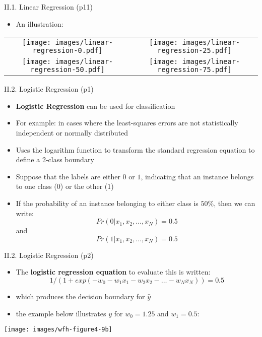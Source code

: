 \documentclass[handout]{beamer}
\newcommand{\strong}[1]{\textbf{\color{teal} #1}}
\newcommand{\stronger}[1]{\textbf{\color{purple} #1}}
\begin{document}
\begin{frame}{II.1. Linear Regression (p11)}
\begin{itemize}
\item[] An illustration:
\end{itemize}
\begin{center}
\begin{tabular}{cc}
\texttt{[image: images/linear-regression-0.pdf]} &
\texttt{[image: images/linear-regression-25.pdf]} \\
\texttt{[image: images/linear-regression-50.pdf]} & 
\texttt{[image: images/linear-regression-75.pdf]} \\
\end{tabular}
\end{center}
\end{frame}
\begin{frame}{II.2. Logistic Regression (p1)}
\begin{itemize}
\item \stronger{Logistic Regression} can be used for classification
\item For example: in cases where the least-squares errors are not statistically independent or normally distributed
\item Uses the logarithm function to transform the standard regression equation to define a 2-class boundary
\item Suppose that the labels are either $0$ or $1$, indicating that an instance belongs to one class ($0$) or the other ($1$)
\item If the probability of an instance belonging to either class is $50\%$, then we can write:
\[
Pr( 0 | x_1, x_2, \ldots, x_N ) = 0.5
\]
and
\[
Pr( 1 | x_1, x_2, \ldots, x_N ) = 0.5
\]
\end{itemize}
\end{frame}
\begin{frame}{II.2. Logistic Regression (p2)}
\begin{itemize}
\item The \strong{logistic regression equation} to evaluate this is written:
\[
1 / ( 1 + exp( -w_0 - w_1 x_1 - w_2 x_2 - \ldots - w_N x_N )) = 0.5
\]
\item which produces the decision boundary for $\hat{y}$
\item the example below illustrates $y$ for $w_0 = 1.25$ and $w_1 = 0.5$:
\end{itemize}
\begin{center}
\texttt{[image: images/wfh-figure4-9b]}\\
\cite[Fig 4.9b]{WFH3:2011}
\end{center}
\end{frame}
\end{document}
